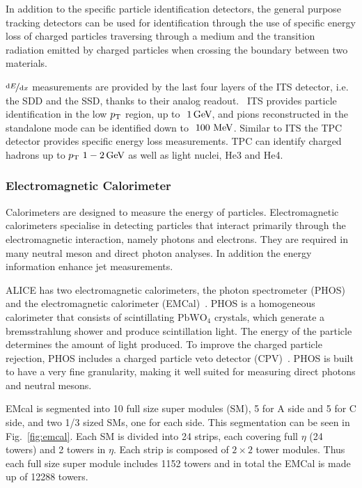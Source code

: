 In addition to the specific particle identification detectors, the general purpose tracking detectors can be used for identification through the use of specific energy loss of charged particles traversing through a medium and the transition radiation emitted by charged particles when crossing the boundary between two materials. 

$\nicefrac{\mathrm{d}E}{\mathrm{d}x}$ measurements are provided by the last four layers of the ITS detector, i.e. the SDD and the SSD, thanks to their analog readout.~\cite{ALICEpid} ITS provides particle identification in the low $p_{\rm T}$ region, up to $~ \unit[1]{\gev}$, and pions reconstructed in the standalone mode can be identified down to $~100 \mbox{~MeV}$. Similar to ITS the TPC detector provides specific energy loss measurements. TPC can identify charged hadrons up to $\pt{} ~ \unit[1-2]{\gev}$ as well as light nuclei, He3 and He4.


\subsubsection{Electromagnetic Calorimeter}
\label{sec:emcal}
Calorimeters are designed to measure the energy of particles. Electromagnetic calorimeters specialise in detecting particles that interact primarily through the electromagnetic interaction, namely photons and electrons. They are required in many neutral meson and direct photon analyses. In addition the energy information enhance jet measurements.

ALICE has two electromagnetic calorimeters, the photon spectrometer (PHOS)~\cite{PHOS} and the electromagnetic calorimeter (EMCal)~\cite{emcal}. PHOS is a homogeneous calorimeter that consists of scintillating $\mathrm{PbWO_4}$ crystals, which generate a bremsstrahlung  shower and produce scintillation light. The energy of the particle determines the amount of light produced. To improve the charged particle rejection, PHOS includes a charged particle veto detector (CPV)~\cite{cpv}. PHOS is built to have a very fine granularity, making it well suited for measuring direct photons and neutral mesons.



EMcal is segmented into 10 full size super modules (SM), 5 for A side and 5 for C side, and two 1/3 sized SMs, one for each side. This segmentation can be seen in Fig.~\ref{fig:emcal}. Each SM is divided into 24 strips, each covering full $\eta$ (24 towers) and 2 towers in $\eta$. Each strip is composed of $2\times2$ tower modules. Thus each full size super module includes 1152 towers and in total the EMCal is made up of 12288 towers.

